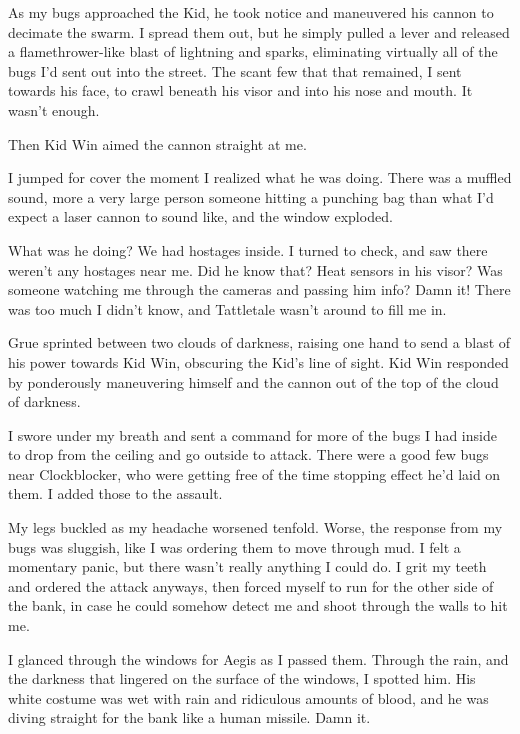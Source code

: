 As my bugs approached the Kid, he took notice and maneuvered his cannon to decimate the swarm.  I spread them out, but he simply pulled a lever and released a flamethrower-like blast of lightning and sparks, eliminating virtually all of the bugs I'd sent out into the street.  The scant few that that remained, I sent towards his face, to crawl beneath his visor and into his nose and mouth.  It wasn't enough.



Then Kid Win aimed the cannon straight at me.



I jumped for cover the moment I realized what he was doing.  There was a muffled sound, more a very large person someone hitting a punching bag than what I'd expect a laser cannon to sound like, and the window exploded.



What was he doing?  We had hostages inside.  I turned to check, and saw there weren't any hostages near me.  Did he know that?  Heat sensors in his visor?  Was someone watching me through the cameras and passing him info?  Damn it!  There was too much I didn't know, and Tattletale wasn't around to fill me in.



Grue sprinted between two clouds of darkness, raising one hand to send a blast of his power towards Kid Win, obscuring the Kid's line of sight.  Kid Win responded by ponderously maneuvering himself and the cannon out of the top of the cloud of darkness.



I swore under my breath and sent a command for more of the bugs I had inside to drop from the ceiling and go outside to attack.  There were a good few bugs near Clockblocker, who were getting free of the time stopping effect he'd laid on them.  I added those to the assault.



My legs buckled as my headache worsened tenfold.  Worse, the response from my bugs was sluggish, like I was ordering them to move through mud.  I felt a momentary panic, but there wasn't really anything I could do.  I grit my teeth and ordered the attack anyways, then forced myself to run for the other side of the bank, in case he could somehow detect me and shoot through the walls to hit me.



I glanced through the windows for Aegis as I passed them.  Through the rain, and the darkness that lingered on the surface of the windows, I spotted him.  His white costume was wet with rain and ridiculous amounts of blood, and he was diving straight for the bank like a human missile.  Damn it.




